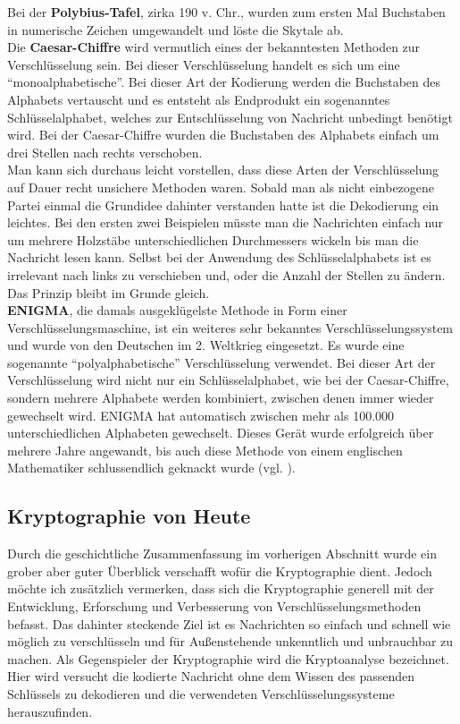\documentclass[german,12pt,a4paper]{article}
\begin{document}
Bei der \textbf{Polybius-Tafel}, zirka 190 v. Chr., wurden zum ersten Mal Buchstaben in numerische Zeichen umgewandelt und löste die Skytale ab.\\

Die \textbf{Caesar-Chiffre} wird vermutlich eines der bekanntesten Methoden zur Verschlüsselung sein.
Bei dieser Verschlüsselung handelt es sich um eine “monoalphabetische”.
Bei dieser Art der Kodierung werden die Buchstaben des Alphabets vertauscht und es entsteht als Endprodukt ein sogenanntes Schlüsselalphabet, welches zur Entschlüsselung von Nachricht unbedingt benötigt wird.
Bei der Caesar-Chiffre wurden die Buchstaben des Alphabets einfach um drei Stellen nach rechts verschoben.\\
Man kann sich durchaus leicht vorstellen, dass diese Arten der Verschlüsselung auf Dauer recht unsichere Methoden waren.
Sobald man als nicht einbezogene Partei einmal die Grundidee dahinter verstanden hatte ist die Dekodierung ein leichtes.
Bei den ersten zwei Beispielen müsste man die Nachrichten einfach nur um mehrere Holzstäbe unterschiedlichen Durchmessers wickeln bis man die Nachricht lesen kann.
Selbst bei der Anwendung des Schlüsselalphabets ist es irrelevant nach links zu verschieben und, oder die Anzahl der Stellen zu ändern.
Das Prinzip bleibt im Grunde gleich.\\

\textbf{ENIGMA}, die damals ausgeklügelste Methode in Form einer Verschlüsselungsmaschine, ist ein weiteres sehr bekanntes Verschlüsselungssystem und wurde von den Deutschen im 2. Weltkrieg eingesetzt.
Es wurde eine sogenannte “polyalphabetische” Verschlüsselung verwendet.
Bei dieser Art der Verschlüsselung wird nicht nur ein Schlüsselalphabet, wie bei der Caesar-Chiffre, sondern mehrere Alphabete werden kombiniert, zwischen denen immer wieder gewechselt wird.
ENIGMA hat automatisch zwischen mehr als 100.000 unterschiedlichen Alphabeten gewechselt.
Dieses Gerät wurde erfolgreich über mehrere Jahre angewandt, bis auch diese Methode von einem englischen Mathematiker schlussendlich geknackt wurde (vgl. \cite[103--105]{RempeGillen2009}).

\subsection{Kryptographie von Heute}\label{Kryptographie von Heute}
Durch die geschichtliche Zusammenfassung im vorherigen Abschnitt wurde ein grober aber guter Überblick verschafft wofür die Kryptographie dient.
Jedoch möchte ich zusätzlich vermerken, dass sich die Kryptographie generell mit der Entwicklung, Erforschung und Verbesserung von Verschlüsselungsmethoden befasst.
Das dahinter steckende Ziel ist es Nachrichten so einfach und schnell wie möglich zu verschlüsseln und für Außenstehende unkenntlich und unbrauchbar zu machen.
Als Gegenspieler der Kryptographie wird die Kryptoanalyse bezeichnet.
Hier wird versucht die kodierte Nachricht ohne dem Wissen des passenden Schlüssels zu dekodieren und die verwendeten Verschlüsselungssysteme herauszufinden.\\
\end{document}
